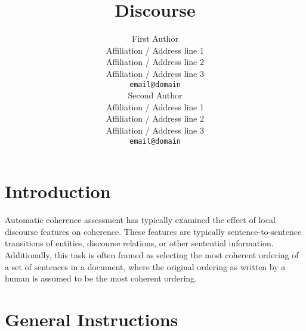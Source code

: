 \documentclass[11pt]{article}
\title{Discourse}
\author{First Author \\
  Affiliation / Address line 1 \\
  Affiliation / Address line 2 \\
  Affiliation / Address line 3 \\
  {\tt email@domain} \\\And
  Second Author \\
  Affiliation / Address line 1 \\
  Affiliation / Address line 2 \\
  Affiliation / Address line 3 \\
  {\tt email@domain} \\}
\date{}
\begin{document}
\maketitle

\begin{abstract}
\end{abstract}

\section{Introduction}

Automatic coherence assessment has typically examined the effect of local discourse features on coherence. These features are typically sentence-to-sentence transitions of entities, discourse relations, or other sentential information.
Additionally, this task is often framed as selecting the most coherent ordering of a set of sentences in a document, where the original ordering as written by a human is assumed to be the most coherent ordering.

\section{General Instructions}






\end{document}
